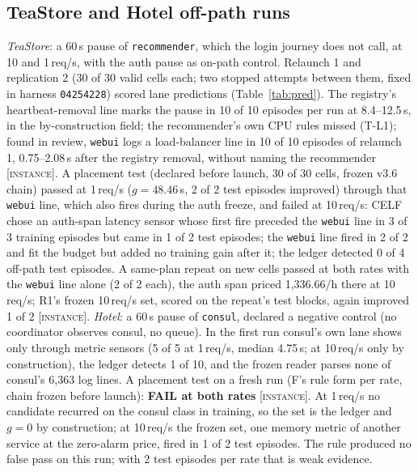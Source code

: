 \documentclass{ceurart}
\newcommand{\scope}[1]{\textsc{[#1]}}
\begin{document}
\subsection{TeaStore and Hotel off-path runs}\label{sec:tsoff}\label{sec:overnight}
\emph{TeaStore}: a 60\,s pause of \texttt{recommender}, which the login journey does not call, at 10 and 1\,req/s, with the
auth pause as on-path control. Relaunch 1 and replication 2 (30 of 30 valid cells each; two stopped attempts between them, fixed in harness
\texttt{04254228}) scored lane predictions
(Table~\ref{tab:pred}). The registry's heartbeat-removal line marks the pause in 10 of 10 episodes per run at
8.4--12.5\,s, in the by-construction field; the recommender's own CPU rules missed (T-L1); found in review, \texttt{webui} logs a load-balancer line in 10 of 10 episodes of
relaunch 1, 0.75--2.08\,s after the registry removal, without naming the recommender \scope{instance}.
A placement test (declared before launch, 30 of 30 cells, frozen v3.6 chain) passed at 1\,req/s ($g = 48.46$\,s, 2 of 2
test episodes improved) through that \texttt{webui} line, which also fires during the auth freeze, and failed at
10\,req/s: CELF chose an auth-span latency sensor whose first fire preceded the \texttt{webui} line in 3 of 3 training
episodes but came in 1 of 2 test episodes; the \texttt{webui} line fired in 2 of 2 and fit the budget but added no training
gain after it; the ledger detected 0 of 4 off-path test episodes. A same-plan repeat on new cells passed at both rates
with the \texttt{webui} line alone (2 of 2 each), the auth span priced 1,336.66/h there at 10\,req/s; R1's frozen 10\,req/s set, scored
on the repeat's test blocks, again improved 1 of 2 \scope{instance}. %
\emph{Hotel}: a 60\,s pause of \texttt{consul}, declared a negative control (no coordinator observes consul, no queue). In
the first run consul's own lane shows only through metric sensors (5 of 5 at 1\,req/s, median 4.75\,s; at 10\,req/s only
by construction), the ledger detects 1 of 10, and the frozen reader parses none of consul's 6,363 log lines. A placement
test on a fresh run (F's rule form per rate, chain frozen before launch): \textbf{FAIL at both rates} \scope{instance}. At 1\,req/s no candidate recurred on the consul class in
training, so the set is the ledger and $g = 0$ by construction; at 10\,req/s the frozen set, one memory metric of another
service at the zero-alarm price, fired in 1 of 2 test episodes. The rule produced no false pass on this run; with 2 test episodes per rate that is weak evidence.
\end{document}
